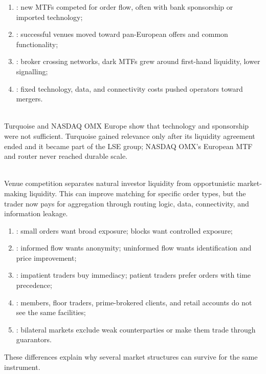 \documentclass[a4paper,oneside,openany]{book}
\begin{document}
\begin{taxonomy} 
\begin{enumerate}[label=\roman*.]
\setlength{\itemsep}{0pt}
\item {}: new MTFs competed for order flow, often with bank sponsorship or imported technology;
\item {}: successful venues moved toward pan-European offers and common functionality;
\item {}: broker crossing networks, dark MTFs grew around first-hand liquidity, lower signalling;
\item {}: fixed technology, data, and connectivity costs pushed operators toward mergers.
\end{enumerate}
\end{taxonomy}

\begin{caveat} \\
Turquoise and NASDAQ OMX Europe show that technology and sponsorship were not sufficient. Turquoise gained relevance only after its liquidity agreement ended and it became part of the LSE group; NASDAQ OMX's European MTF and router never reached durable scale.
\end{caveat}

\begin{caveat} \\
Venue competition separates natural investor liquidity from opportunistic market-making liquidity. This can improve matching for specific order types, but the trader now pays for aggregation through routing logic, data, connectivity, and information leakage.
\end{caveat}

\begin{taxonomy} 
\begin{enumerate}[label=\roman*.]
\setlength{\itemsep}{0pt}
\item {}: small orders want broad exposure; blocks want controlled exposure;
\item {}: informed flow wants anonymity; uninformed flow wants identification and price improvement;
\item {}: impatient traders buy immediacy; patient traders prefer orders with time precedence;
\item {}: members, floor traders, prime-brokered clients, and retail accounts do not see the same facilities;
\item {}: bilateral markets exclude weak counterparties or make them trade through guarantors.
\end{enumerate}
These differences explain why several market structures can survive for the same instrument.
\end{taxonomy}
\end{document}
